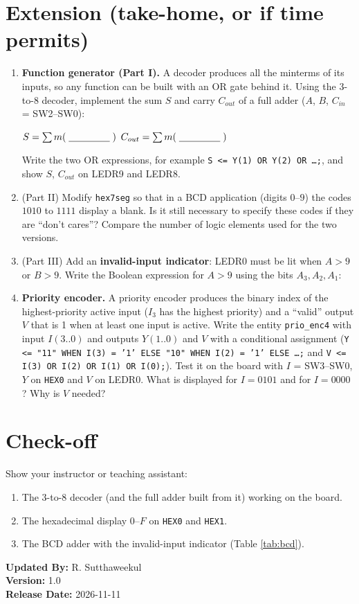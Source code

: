 \documentclass{article}
\begin{document}
\section*{Extension (take-home, or if time permits)}
\begin{enumerate}
    \item \textbf{Function generator (Part I).} A decoder produces all the minterms of its inputs, so any function can be built with an OR gate behind it. Using the 3-to-8 decoder, implement the sum $S$ and carry $C_{out}$ of a full adder ($A$, $B$, $C_{in}$ = SW2--SW0):
    \begin{center}
        $S = \sum m(\;\underline{\hspace{1.5cm}}\;)$ \qquad $C_{out} = \sum m(\;\underline{\hspace{1.5cm}}\;)$
    \end{center}
    Write the two OR expressions, for example \texttt{S <= Y(1) OR Y(2) OR \ldots;}, and show $S$, $C_{out}$ on LEDR9 and LEDR8.

    \item (Part II) Modify \texttt{hex7seg} so that in a BCD application (digits $0$--$9$) the codes $1010$ to $1111$ display a blank. Is it still necessary to specify these codes if they are ``don't cares''? Compare the number of logic elements used for the two versions. \underline{\hspace{3cm}}
    \item (Part III) Add an \textbf{invalid-input indicator}: LEDR0 must be lit when $A > 9$ or $B > 9$. Write the Boolean expression for $A > 9$ using the bits $A_3, A_2, A_1$: \underline{\hspace{4cm}}
    \item \textbf{Priority encoder.} A priority encoder produces the binary index of the highest-priority active input ($I_3$ has the highest priority) and a ``valid'' output $V$ that is 1 when at least one input is active. Write the entity \texttt{prio\_enc4} with input $I(3..0)$ and outputs $Y(1..0)$ and $V$ with a conditional assignment (\texttt{Y <= "11" WHEN I(3) = '1' ELSE "10" WHEN I(2) = '1' ELSE \ldots;} and \texttt{V <= I(3) OR I(2) OR I(1) OR I(0);}). Test it on the board with $I$ = SW3--SW0, $Y$ on \texttt{HEX0} and $V$ on LEDR0. What is displayed for $I = 0101$ and for $I=0000$? Why is $V$ needed?
\end{enumerate}

\section*{Check-off}
Show your instructor or teaching assistant:
\begin{enumerate}
    \item The 3-to-8 decoder (and the full adder built from it) working on the board.
    \item The hexadecimal display $0$--$F$ on \texttt{HEX0} and \texttt{HEX1}.
    \item The BCD adder with the invalid-input indicator (Table \ref{tab:bcd}).
\end{enumerate}

\vspace{1cm}
\noindent \textbf{Updated By:} R. Sutthaweekul \\
\textbf{Version:} 1.0 \\
\textbf{Release Date:} 2026-11-11
\end{document}
